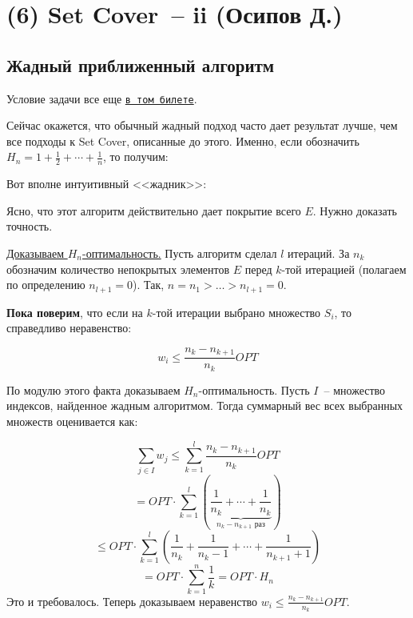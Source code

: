 \section{(6) Set Cover~-- ii (Осипов Д.)}
\subsection{Жадный приближенный алгоритм}
Условие задачи все еще \hyperlink{setcover}{\texttt{в том билете}}.

Сейчас окажется, что обычный жадный подход часто дает результат лучше, чем все подходы к Set Cover, описанные до этого. Именно, если обозначить $H_n = 1 + \frac{1}{2} + \cdots + \frac{1}{n}$, то получим:


Вот вполне интуитивный <<жадник>>:

\begin{algorithm}[H]
	\DontPrintSemicolon
\end{algorithm}

Ясно, что этот алгоритм действительно дает покрытие всего $E$. Нужно доказать точность.

\underline{Доказываем $H_n$-оптимальность.} Пусть алгоритм сделал $l$ итераций. За $n_k$ обозначим количество непокрытых элементов $E$ перед $k$-той итерацией (полагаем по определению $n_{l+1}=0$). Так, $n = n_1 > \ldots > n_{l+1} = 0$.

\textbf{Пока поверим}, что если на $k$-той итерации выбрано множество $S_i$, то справедливо неравенство:

$$w_i \leq \frac{n_k - n_{k+1}}{n_k}OPT$$

По модулю этого факта доказываем $H_n$-оптимальность. Пусть $I$~-- множество индексов, найденное жадным алгоритмом. Тогда суммарный вес всех выбранных множеств оценивается как:

$$\sum_{j\in I}w_j \leq \sum_{k=1}^l\frac{n_k-n_{k+1}}{n_k} OPT$$
$$ = OPT\cdot\sum_{k=1}^l\left(\underbrace{\frac{1}{n_k} + \cdots + \frac{1}{n_k}}_{n_k-n_{k+1}\text{ раз}}\right)$$
$$ \leq OPT \cdot\sum_{k=1}^l\left(\frac{1}{n_k} + \frac{1}{n_k - 1} + \cdots + \frac{1}{n_{k+1}+1}\right)$$
$$ = OPT\cdot\sum_{k=1}^n\frac{1}{k} = OPT\cdot H_n$$
Это и требовалось. Теперь доказываем неравенство $w_i \leq \frac{n_k - n_{k+1}}{n_k}OPT$.

